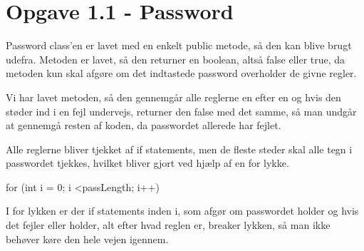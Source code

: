 \section{Opgave 1.1 - Password}

Password class'en er lavet med en enkelt public metode, så den kan blive brugt udefra. Metoden er lavet, så den returner en boolean, altså false eller true, da metoden kun skal afgøre om det indtastede password overholder de givne regler.

Vi har lavet metoden, så den gennemgår alle reglerne en efter en og hvis den støder ind i en fejl undervejs, returner den false med det samme, så man undgår at gennemgå resten af koden, da passwordet allerede har fejlet.

Alle reglerne bliver tjekket af if statements, men de fleste steder skal alle tegn i passwordet tjekkes, hvilket bliver gjort ved hjælp af en for lykke.

\begin{center}
    for (int i = 0; i \textless passLength; i++)
\end{center}

I for lykken er der if statements inden i, som afgør om passwordet holder og hvis det fejler eller holder, alt efter hvad reglen er, breaker lykken, så man ikke behøver køre den hele vejen igennem.